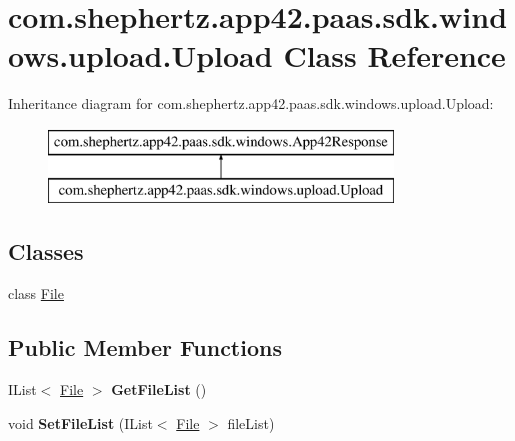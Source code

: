 \hypertarget{classcom_1_1shephertz_1_1app42_1_1paas_1_1sdk_1_1windows_1_1upload_1_1_upload}{\section{com.\+shephertz.\+app42.\+paas.\+sdk.\+windows.\+upload.\+Upload Class Reference}
\label{classcom_1_1shephertz_1_1app42_1_1paas_1_1sdk_1_1windows_1_1upload_1_1_upload}
}
Inheritance diagram for com.\+shephertz.\+app42.\+paas.\+sdk.\+windows.\+upload.\+Upload\+:\begin{figure}[H]
\begin{center}
\leavevmode
\includegraphics[height=2.000000cm]{classcom_1_1shephertz_1_1app42_1_1paas_1_1sdk_1_1windows_1_1upload_1_1_upload}
\end{center}
\end{figure}
\subsection*{Classes}
\begin{DoxyCompactItemize}
\item 
class \hyperlink{classcom_1_1shephertz_1_1app42_1_1paas_1_1sdk_1_1windows_1_1upload_1_1_upload_1_1_file}{File}
\end{DoxyCompactItemize}
\subsection*{Public Member Functions}
\begin{DoxyCompactItemize}
\item 
\hypertarget{classcom_1_1shephertz_1_1app42_1_1paas_1_1sdk_1_1windows_1_1upload_1_1_upload_ac20b74fa7cc8b4928547918f42241061}{I\+List$<$ \hyperlink{classcom_1_1shephertz_1_1app42_1_1paas_1_1sdk_1_1windows_1_1upload_1_1_upload_1_1_file}{File} $>$ {\bfseries Get\+File\+List} ()}\label{classcom_1_1shephertz_1_1app42_1_1paas_1_1sdk_1_1windows_1_1upload_1_1_upload_ac20b74fa7cc8b4928547918f42241061}

\item 
\hypertarget{classcom_1_1shephertz_1_1app42_1_1paas_1_1sdk_1_1windows_1_1upload_1_1_upload_ab4f00d04a2cddf2196e250117e4d3e93}{void {\bfseries Set\+File\+List} (I\+List$<$ \hyperlink{classcom_1_1shephertz_1_1app42_1_1paas_1_1sdk_1_1windows_1_1upload_1_1_upload_1_1_file}{File} $>$ file\+List)}\label{classcom_1_1shephertz_1_1app42_1_1paas_1_1sdk_1_1windows_1_1upload_1_1_upload_ab4f00d04a2cddf2196e250117e4d3e93}

\end{DoxyCompactItemize}
